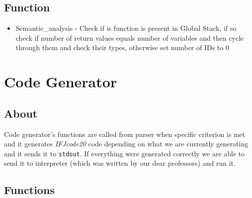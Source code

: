 \documentclass[11pt, titlepage]{article}
\begin{document}
\subsection{Function}\label{function_sym}
\begin{itemize}
\item Semantic\_analysis - Check if is function is present in Global Stack, if so check if number of return values equals number of variables and then cycle through them and check their types, otherwise set number of IDs to 0
\end{itemize}




\section{Code Generator}\label{code-generator}

\subsection{About}\label{about-3}

Code generator's functions are called from parser when
specific criterion is met and it generates \emph{IFJcode20} code
depending on what we are currently generating and it sends it to
\texttt{stdout}. If everything were generated correctly we are able to
send it to interpreter (which was written by our dear professors) and
run it.

\subsection{Functions}\label{functions-1}
\end{document}
